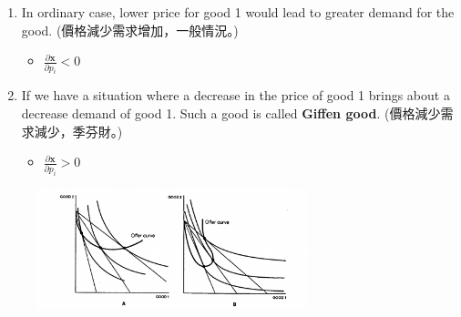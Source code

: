 
\begin{enumerate}
    \item In ordinary case, lower price for good 1 would lead to greater demand for the good.
    (價格減少需求增加，一般情況。)
    \begin{itemize}
        \item $\frac{\partial \mathbf{x}}{\partial p_i} < 0$
    \end{itemize}
    \item If we have a situation where a decrease in the price of good 1 brings about a decrease demand of good 1.
    Such a good is called \textbf{Giffen good}.
    (價格減少需求減少，季芬財。)
    \begin{itemize}
        \item $\frac{\partial \mathbf{x}}{\partial p_i} > 0$
    \end{itemize}
\end{enumerate}

\begin{figure}[h]
    \center
    \includegraphics[width=0.7\textwidth]{img/fig8-2.png}
    \caption{}
\end{figure}

